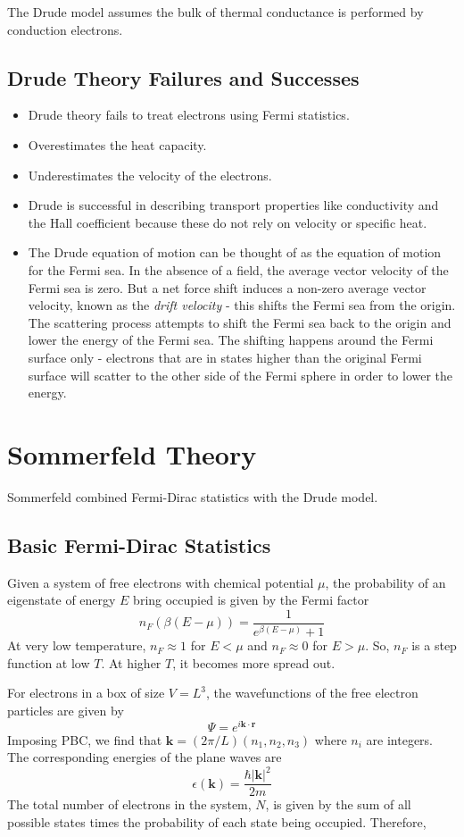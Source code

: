 \documentclass[10pt]{article}
\begin{document}
The Drude model assumes the bulk of thermal conductance is performed by conduction electrons.

\subsection{Drude Theory Failures and Successes}
\begin{itemize}
  \item Drude theory fails to treat electrons using Fermi statistics.
  \item Overestimates the heat capacity.
  \item Underestimates the velocity of the electrons.
  \item Drude is successful in describing transport properties like conductivity and the Hall coefficient because
  these do not rely on velocity or specific heat.
  \item The Drude equation of motion can be thought of as the equation of motion for the Fermi sea. In the absence of a field, the
  average vector velocity of the Fermi sea is zero. But a net force shift induces a non-zero average vector velocity, known as the
  \emph{drift velocity} - this shifts the Fermi sea from the origin. The scattering process attempts to shift the Fermi sea back to the
  origin and lower the energy of the Fermi sea. The shifting happens around the Fermi surface only - electrons that are in states higher
  than the original Fermi surface will scatter to the other side of the Fermi sphere in order to lower the energy.
\end{itemize}

\section{Sommerfeld Theory}
Sommerfeld combined Fermi-Dirac statistics with the Drude model.
\subsection{Basic Fermi-Dirac Statistics}
Given a system of free electrons with chemical potential $\mu$, the probability of an eigenstate of energy $E$ bring occupied is given by the
Fermi factor
$$n_{F}(\beta(E-\mu)) = \frac{1}{e^{\beta(E - \mu)}+1}$$
At very low temperature, $n_{F} \approx 1$ for $E < \mu$ and $n_{F} \approx 0$ for $E > \mu$. So, $n_{F}$ is a step function
at low $T$. At higher $T$, it becomes more spread out.

For electrons in a box of size $V = L^{3}$, the wavefunctions of the free electron particles are given by
$$\Psi = e^{i\textbf{k}\cdot\textbf{r}}$$
Imposing PBC, we find that $\textbf{k} = (2\pi/L)(n_{1},n_{2},n_{3})$ where $n_{i}$ are integers. The corresponding
energies of the plane waves are
$$\epsilon(\textbf{k}) = \frac{\hbar |\textbf{k}|^{2}}{2m}$$
The total number of electrons in the system, $N$, is given by the sum of all possible states times the probability of each state being occupied.
Therefore,
\end{document}
